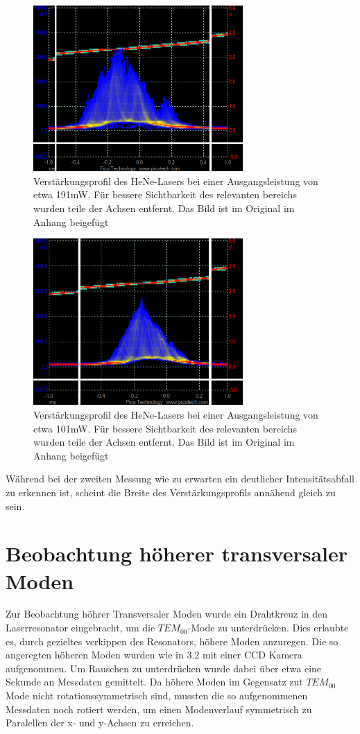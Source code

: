 \documentclass[bigchapter,colorback,accentcolor=tud4b,linedtoc,11pt]{tudreport}
\numberwithin{equation}{subsection}
\begin{document}
\begin{figure}[ht!]
\centering
\includegraphics[width=80mm]{Messdaten/81cm191mW4uW.png}
\caption{Verstärkungsprofil des HeNe-Lasers bei einer Ausgangsleistung von etwa 191mW. Für bessere Sichtbarkeit des relevanten bereichs wurden teile der Achsen entfernt. Das Bild ist im Original im Anhang beigefügt}
\label{HeNeBreite191mW}
\end{figure}
\begin{figure}[ht!]
\centering
\includegraphics[width=80mm]{Messdaten/81cm101mW4uW.png}
\caption{Verstärkungsprofil des HeNe-Lasers bei einer Ausgangsleistung von etwa 101mW. Für bessere Sichtbarkeit des relevanten bereichs wurden teile der Achsen entfernt. Das Bild ist im Original im Anhang beigefügt}
\label{HeNeBreite101mW}
\end{figure}
\FloatBarrier
Während bei der zweiten Messung wie zu erwarten ein deutlicher Intensitätsabfall zu erkennen ist, scheint die Breite des Verstärkungsprofils annähend gleich zu sein.
\section{Beobachtung höherer transversaler Moden}
Zur Beobachtung höhrer Transversaler Moden wurde ein Drahtkreuz in den Laserresonator eingebracht, um die $TEM_{00}$-Mode zu unterdrücken. Dies erlaubte es, durch gezieltes verkippen des Resonators, höhere Moden anzuregen. Die so angeregten höheren Moden wurden wie in 3.2 mit einer CCD Kamera aufgenommen. Um Rauschen zu unterdrücken wurde dabei über etwa eine Sekunde an Messdaten gemittelt. Da höhere Moden im Gegensatz zut $TEM_{00}$ Mode nicht rotationssymmetrisch sind, mussten die so aufgenommenen Messdaten noch rotiert werden, um einen Modenverlauf symmetrisch zu Paralellen der x- und y-Achsen zu erreichen.
\end{document}

